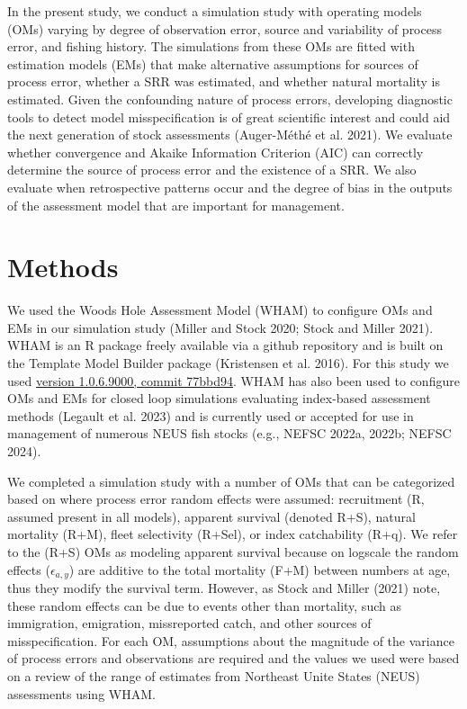\documentclass[
  12pt,
]{article}
\begin{document}
In the present study, we conduct a simulation study with operating
models (OMs) varying by degree of observation error, source and
variability of process error, and fishing history. The simulations from
these OMs are fitted with estimation models (EMs) that make alternative
assumptions for sources of process error, whether a SRR was estimated,
and whether natural mortality is estimated. Given the confounding nature
of process errors, developing diagnostic tools to detect model
misspecification is of great scientific interest and could aid the next
generation of stock assessments (Auger-Méthé et al. 2021). We evaluate
whether convergence and Akaike Information Criterion (AIC) can correctly
determine the source of process error and the existence of a SRR. We
also evaluate when retrospective patterns occur and the degree of bias
in the outputs of the assessment model that are important for
management.

\hypertarget{methods}{%
\section*{Methods}\label{methods}}

We used the Woods Hole Assessment Model (WHAM) to configure OMs and EMs
in our simulation study (Miller and Stock 2020; Stock and Miller 2021).
WHAM is an R package freely available via a github repository and is
built on the Template Model Builder package (Kristensen et al. 2016).
For this study we used
\href{https://github.com/timjmiller/wham/tree/77bbd946e4881216a439933473d1c58b21c270c3}{version
1.0.6.9000, commit 77bbd94}. WHAM has also been used to configure OMs
and EMs for closed loop simulations evaluating index-based assessment
methods (Legault et al. 2023) and is currently used or accepted for use
in management of numerous NEUS fish stocks (e.g., NEFSC 2022a, 2022b;
NEFSC 2024).

We completed a simulation study with a number of OMs that can be
categorized based on where process error random effects were assumed:
recruitment (R, assumed present in all models), apparent survival
(denoted R+S), natural mortality (R+M), fleet selectivity (R+Sel), or
index catchability (R+q). We refer to the (R+S) OMs as modeling apparent
survival because on logscale the random effects (\(\epsilon_{a,y}\)) are
additive to the total mortality (F+M) between numbers at age, thus they
modify the survival term. However, as Stock and Miller (2021) note,
these random effects can be due to events other than mortality, such as
immigration, emigration, missreported catch, and other sources of
misspecification. For each OM, assumptions about the magnitude of the
variance of process errors and observations are required and the values
we used were based on a review of the range of estimates from Northeast
Unite States (NEUS) assessments using WHAM.
\end{document}
